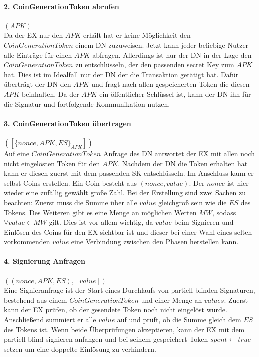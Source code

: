\documentclass[
	fontsize=11pt,
	headings=small,
	parskip=half,           %
	bibliography=totoc,
	numbers=noenddot,       %
	open=any,               %
]{scrreprt}
\begin{document}
\paragraph{2. CoinGenerationToken abrufen} $(APK)$\\
Da der EX nur den $APK$ erhält hat er keine Möglichkeit den $CoinGenerationToken$ einem DN zuzuweisen. Jetzt kann jeder beliebige Nutzer alle Einträge für einen $APK$ abfragen. Allerdings ist nur der DN in der Lage den $CoinGenerationToken$ zu entschlüsseln, der den passenden secret Key zum $APK$ hat. Dies ist im Idealfall nur der DN der die Transaktion getätigt hat. Dafür überträgt der DN den $APK$ und fragt nach allen gespeicherten Token die diesen $APK$ beinhalten. Da der $APK$ ein öffentlicher Schlüssel ist, kann der DN ihn für die Signatur und fortfolgende Kommunikation nutzen.

\paragraph{3. CoinGenerationToken übertragen} $([\{nonce, APK, ES\}_{APK}])$\\
Auf eine $CoinGenerationToken$ Anfrage des DN antwortet der EX mit allen noch nicht eingelösten Token für den $APK$. Nachdem der DN die Token erhalten hat kann er diesen zuerst mit dem passenden SK entschlüsseln. Im Anschluss kann er selbst Coins erstellen. Ein Coin besteht aus $(nonce, value)$. Der $nonce$ ist hier wieder eine zufällig gewählt große Zahl. Bei der Erstellung sind zwei Sachen zu beachten: Zuerst muss die Summe über alle $value$ gleichgroß sein wie die $ES$ des Tokens. Des Weiteren gibt es eine Menge an möglichen Werten $MW$, sodass $\forall value\in MW$ gilt. Dies ist vor allem wichtig, da $value$ beim Signieren und Einlösen des Coins für den EX sichtbar ist und dieser bei einer Wahl eines selten vorkommenden $value$ eine Verbindung zwischen den Phasen herstellen kann.

\paragraph{4. Signierung Anfragen} $((nonce, APK, ES), [value])$\\
Eine Signieranfrage ist der Start eines Durchlaufs von partiell blinden Signaturen, bestehend aus einem $CoinGenerationToken$ und einer Menge an $values$. Zuerst kann der EX prüfen, ob der gesendete Token noch nicht eingelöst wurde. Anschließend summiert er alle $value$ auf und prüft, ob die Summe gleich dem $ES$ des Tokens ist. Wenn beide Überprüfungen akzeptieren, kann der EX mit dem partiell blind signieren anfangen und bei seinem gespeichert Token $spent \leftarrow true$ setzen um eine doppelte Einlösung zu verhindern.
\end{document}
